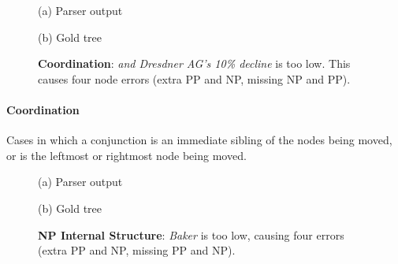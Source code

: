 \begin{figure}
\begin{center}

\vspace{3mm}
(a) Parser output

\vspace{6mm}


\vspace{3mm}
(b) Gold tree
\end{center}
\derivspace
\caption{
	\label{fig:coordination}
	\textbf{Coordination}: \emph{and Dresdner AG's 10\% decline} is too low.
	This causes four node errors (extra PP and NP, missing NP and PP).
}
\derivaftercompress
\end{figure}

\paragraph{Coordination}
Cases in which a conjunction is an immediate sibling of the nodes being moved, or is the leftmost or rightmost node being moved.

\begin{figure}
\begin{center}

\vspace{3mm}
(a) Parser output

\vspace{6mm}


\vspace{3mm}
(b) Gold tree
\end{center}
\derivspace
\caption{
	\label{fig:NP-internal-structure}
	\textbf{NP Internal Structure}: \emph{Baker} is too low, causing four
	errors (extra PP and NP, missing PP and NP).
}
\derivaftercompress
\end{figure}

